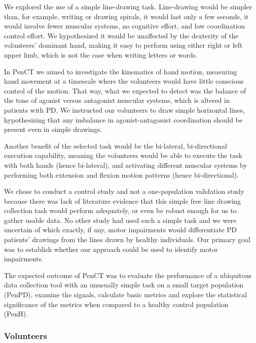 We explored the use of a simple line-drawing task. Line-drawing would be simpler than, for example, writing or drawing spirals, it would last only a few seconds, it would involve fewer muscular systems, no cognitive effort, and low coordination control effort. We hypothesized it would be unaffected by the dexterity of the volunteers' dominant hand, making it easy to perform using either right or left upper limb, which is not the case when writing letters or words. 

In \gls{PenCT} we aimed to investigate the kinematics of hand motion, measuring hand movement at a timescale where the volunteers would have little conscious control of the motion. That way, what we expected to detect was the balance of the tone of agonist versus antagonist muscular systems, which is altered in patients with \gls{PD}. We instructed our volunteers to draw simple horizontal lines, hypothesizing that any imbalance in agonist-antagonist coordination should be present even in simple drawings.

Another benefit of the selected task would be the bi-lateral, bi-directional execution capability, meaning the volunteers would be able to execute the task with both hands (hence bi-lateral), and activating different muscular systems by performing both extension and flexion motion patterns (hence bi-directional). 

We chose to conduct a control study and not a one-population validation study because there was lack of literature evidence that this simple free line drawing collection task would perform adequately, or even be robust enough for us to gather usable data. No other study had used such a simple task and we were uncertain of which exactly, if any, motor impairments would differentiate \gls{PD} patients' drawings from the lines drawn by healthy individuals. Our primary goal was to establish whether our approach could be used to identify motor impairments. 

The expected outcome of \gls{PenCT} was to evaluate the performance of a ubiquitous data collection tool with an unusually simple task on a small target population (\gls{PenPD}), examine the signals, calculate basic metrics and explore the statistical significance of the metrics when compared to a healthy control population (\gls{PenH}). 


\subsubsection{Volunteers}
\label{subsubsec:PenCTVolunteers}

